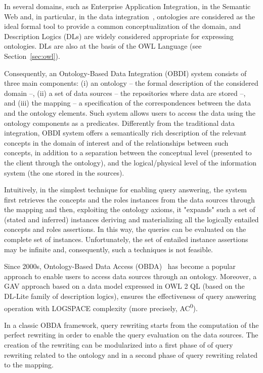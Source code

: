 In several domains, such as Enterprise Application Integration, in the Semantic Web and, in particular, in the data integration~\cite{LenzeriniOBDI}, ontologies are considered as the ideal formal tool to provide a common conceptualization of the domain, and Description Logics (DLs) are widely considered appropriate for expressing ontologies. DLs are also at the basis of the OWL Language (see Section~\ref{sec:owl}).

Consequently, an Ontology-Based Data Integration (OBDI) system consists of three main components: (i) an ontology -- the formal description of the considered domain --, (ii) a set of data sources -- the repositories where data are stored --, and (iii) the mapping -- a specification of the correspondences between the data and the ontology elements. Such system allows users to access the data using the ontology components as a predicates. 
Differently from the traditional data integration, OBDI system offers a semantically rich description of the relevant concepts in the domain of interest and of the relationships between such concepts, in addition to a separation between the conceptual level (presented to the client through the ontology),
and the logical/physical level of the information system (the one stored in the sources).

Intuitively, in the simplest technique for enabling query answering, the system first retrieves the concepts and the roles instances from the data sources through the mapping and then, exploiting the ontology axioms, it "expands" such a set of (stated and inferred) instances deriving and materializing all the logically entailed concepts and roles assertions. 
In this way, the queries can be evaluated on the complete set of instances. Unfortunately, the set of entailed instance assertions may be infinite and, consequently, such a techniques is not feasible. 

Since 2000s, Ontology-Based Data Access (OBDA)~\cite{DBLP:journals/jods/PoggiLCGLR08} has become a popular approach to enable users to access data sources through an ontology.
Moreover, a GAV approach based on a data model expressed in OWL 2 QL (based on the DL-Lite family of description logics), ensures the effectiveness of query answering operation with LOGSPACE complexity (more precisely, AC\textsuperscript{0}).

In a classic OBDA framework, query rewriting starts from the computation of the perfect rewriting in order to enable the query evaluation on the data sources. The creation of the rewriting can be modularized into a first phase of of query rewriting related to the ontology and in a second phase of query rewriting related to the mapping.

